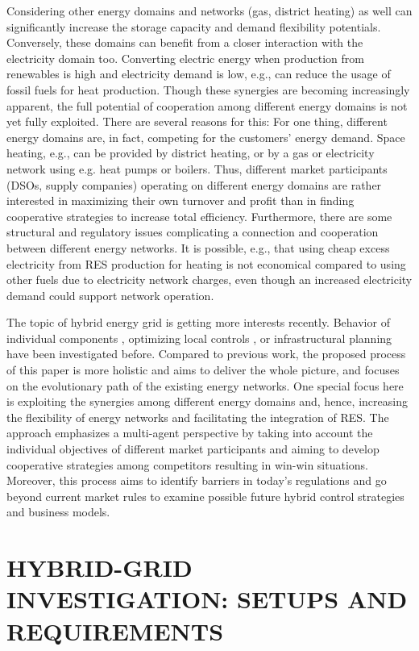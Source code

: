 \documentclass[review]{elsarticle}
\begin{document}
Considering other energy domains and networks (gas, district
heating) as well can significantly increase the storage capacity and
demand flexibility potentials. Conversely, these domains can benefit
from a closer interaction with the electricity domain too. Converting
electric energy when production from renewables is high and
electricity demand is low, e.g., can reduce the usage of
fossil fuels for heat production. Though these synergies are becoming
increasingly apparent, the full potential of cooperation among
different energy domains is not yet fully exploited. There are
several reasons for this: For one thing, different energy domains are,
in fact, competing for the customers’ energy demand. Space heating, e.g.,
can be provided by district heating,  or by a gas or electricity network
using e.g. heat pumps or boilers. Thus, different market
participants (DSOs, supply companies) operating on different energy
domains are rather interested in maximizing their own turnover and
profit than in finding cooperative strategies to increase total
efficiency. Furthermore, there are some structural and regulatory
issues complicating a connection and cooperation between different
energy networks. It is possible, e.g., that using cheap excess
electricity from RES production for heating is not economical compared
to using other fuels due to electricity network charges, even though
an increased electricity demand could support network operation.

The topic of hybrid energy grid is getting more interests recently. 
Behavior of individual components \cite{keirstead_2012}, optimizing
local controls \cite{etransport, arnold_2009}, or infrastructural
planning \cite{infraplan} have been investigated before. 
Compared to previous work, the proposed process of this paper is more
holistic and aims to deliver the whole picture, and focuses on the
evolutionary path of the existing energy networks. 
One special focus here is exploiting the synergies among different
energy domains and, hence, increasing the flexibility of energy
networks and facilitating the integration of RES. The approach
emphasizes a multi-agent perspective by taking into account the
individual objectives of different market participants and aiming to
develop cooperative strategies among competitors resulting in win-win 
situations. Moreover, this process aims to identify barriers in
today’s regulations and go beyond current market rules to examine
possible future hybrid control strategies and business models. 

\section{\uppercase{Hybrid-grid Investigation: 
Setups and Requirements}}
\label{sec:req}
\end{document}
